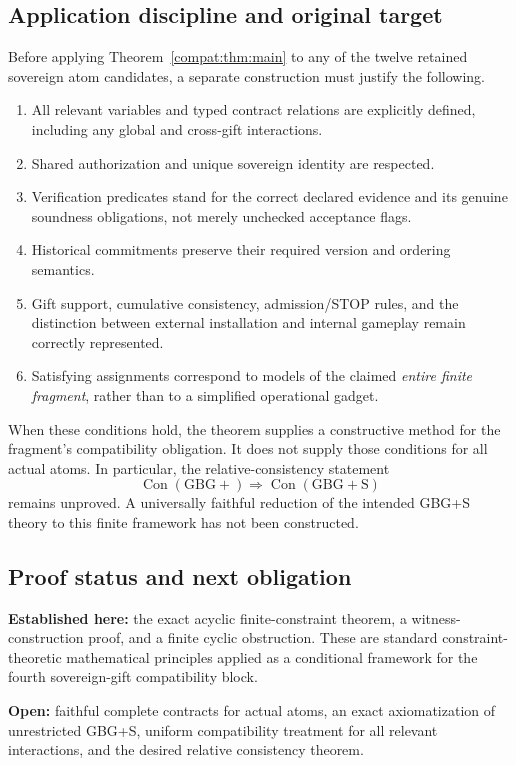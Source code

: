\documentclass[11pt,letterpaper]{article}
\theoremstyle{definition}\newtheorem{definition}[theorem]{Definition}\newtheorem{example}[theorem]{Example}
\theoremstyle{remark}\newtheorem{remark}[theorem]{Remark}
\newcommand{\Con}{\operatorname{Con}}
\begin{document}
\subsection{Application discipline and original target}
Before applying Theorem~\ref{compat:thm:main} to any of the twelve retained sovereign atom candidates, a separate construction must justify the following.
\begin{enumerate}[label=(\arabic*),leftmargin=*]
\item All relevant variables and typed contract relations are explicitly defined, including any global and cross-gift interactions.
\item Shared authorization and unique sovereign identity are respected.
\item Verification predicates stand for the correct declared evidence and its genuine soundness obligations, not merely unchecked acceptance flags.
\item Historical commitments preserve their required version and ordering semantics.
\item Gift support, cumulative consistency, admission/STOP rules, and the distinction between external installation and internal gameplay remain correctly represented.
\item Satisfying assignments correspond to models of the claimed \emph{entire finite fragment}, rather than to a simplified operational gadget.
\end{enumerate}

When these conditions hold, the theorem supplies a constructive method for the fragment's compatibility obligation. It does not supply those conditions for all actual atoms. In particular, the relative-consistency statement
\[
\Con(\mathrm{GBG+})\Longrightarrow\Con(\mathrm{GBG+S})
\]
remains unproved. A universally faithful reduction of the intended GBG+S theory to this finite framework has not been constructed.

\subsection{Proof status and next obligation}
\noindent\textbf{Established here:} the exact acyclic finite-constraint theorem, a witness-construction proof, and a finite cyclic obstruction. These are standard constraint-theoretic mathematical principles applied as a conditional framework for the fourth sovereign-gift compatibility block.

\medskip\noindent\textbf{Open:} faithful complete contracts for actual atoms, an exact axiomatization of unrestricted GBG+S, uniform compatibility treatment for all relevant interactions, and the desired relative consistency theorem.
\end{document}
